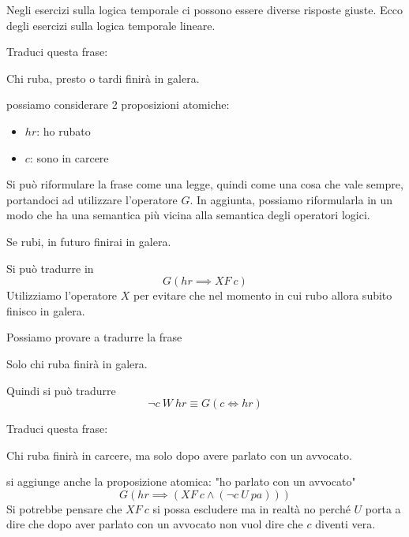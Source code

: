 Negli esercizi sulla logica temporale ci possono essere diverse risposte giuste.
Ecco degli esercizi sulla logica temporale lineare.
\begin{esempio}
    Traduci questa frase:
    \begin{center}
        Chi ruba, presto o tardi finirà in galera.
    \end{center}
    possiamo considerare 2 proposizioni atomiche:
    \begin{itemize}
        \item $hr$: ho rubato
        \item $c$: sono in carcere
    \end{itemize}
    Si può riformulare la frase come una legge, quindi come una cosa che vale
    sempre, portandoci ad utilizzare l'operatore $G$. In aggiunta, possiamo
    riformularla in un modo che ha una semantica più vicina alla semantica degli
    operatori logici.
    \begin{center}
        Se rubi, in futuro finirai in galera.
    \end{center}
    Si può tradurre in
    \begin{equation}
        G(hr \implies XF \ c)
    \end{equation}
    Utilizziamo l'operatore $X$ per evitare che nel momento in cui rubo allora
    subito finisco in galera.

    Possiamo provare a tradurre la frase
    \begin{center}
        Solo chi ruba finirà in galera.
    \end{center}
    Quindi si può tradurre
    \begin{equation}
        \lnot c \ W \ hr \equiv G(c \iff hr)
    \end{equation}
\end{esempio}
\begin{esempio}
    Traduci questa frase:
    \begin{center}
        Chi ruba finirà in carcere, ma solo dopo avere parlato con un avvocato.
    \end{center}
    si aggiunge anche la proposizione atomica: "ho parlato con un avvocato"
    \begin{equation}
        G(hr\implies (XF \ c \land (\lnot c \ U \ pa)))
    \end{equation}
    Si potrebbe pensare che $XF \ c$ si possa escludere ma in realtà no perché
    $U$ porta a dire che dopo aver parlato con un avvocato non vuol dire che $c$
    diventi vera.
\end{esempio}
